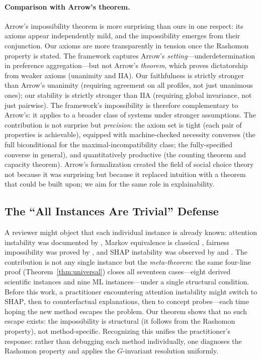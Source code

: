 \documentclass[11pt,a4paper]{article}
\newcommand{\SHAP}{\textsc{SHAP}}
\begin{document}
\paragraph{Comparison with Arrow's theorem.}
Arrow's impossibility theorem \citep{arrow1951social} is more surprising than
ours in one respect: its axioms appear independently mild, and the impossibility
emerges from their conjunction.  Our axioms are more transparently in tension
once the Rashomon property is stated.  The framework captures Arrow's \emph{setting}---underdetermination in preference aggregation---but not Arrow's \emph{theorem}, which proves dictatorship from weaker axioms (unanimity and IIA).  Our faithfulness is strictly stronger than Arrow's unanimity (requiring agreement on all profiles, not just unanimous ones); our stability is strictly stronger than IIA (requiring global invariance, not just pairwise).  The framework's impossibility is therefore complementary to Arrow's: it applies to a broader class of systems under stronger assumptions.  The contribution is not surprise but
\emph{precision}: the axiom set is tight (each pair of properties is
achievable), equipped with machine-checked necessity converses (the full
biconditional for the maximal-incompatibility class; the fully-specified
converse in general), and quantitatively
productive (the counting theorem and capacity theorem).  Arrow's formalization
created the field of social choice theory not because it was surprising but
because it replaced intuition with a theorem that could be built upon; we aim
for the same role in explainability.

\subsection[The All Instances Are Trivial Defense]{The ``All Instances Are Trivial'' Defense}
\label{sec:trivial}

A reviewer might object that each individual instance is already known: attention
instability was documented by \citet{jainwallace2019}, Markov equivalence is
classical \citep{verma1991equivalence}, fairness impossibility was proved by
\citet{chouldechova2017fair}, and \SHAP{} instability was observed by
\citet{damour2022underspecification} and \citet{krishna2022disagreement}.  The
contribution is not any single instance but the \emph{meta-theorem}: the same
four-line proof (Theorem~\ref{thm:universal}) closes all seventeen cases---eight
derived scientific instances and nine ML instances---under a
single structural condition.  Before this work, a practitioner encountering
attention instability might switch to \SHAP{}, then to counterfactual
explanations, then to concept probes---each time hoping the new method escapes
the problem.  Our theorem shows that no such escape exists: the impossibility
is structural (it follows from the Rashomon property), not method-specific.
Recognizing this unifies the practitioner's response: rather than debugging each
method individually, one diagnoses the Rashomon property and applies the
$G$-invariant resolution uniformly.
\end{document}
